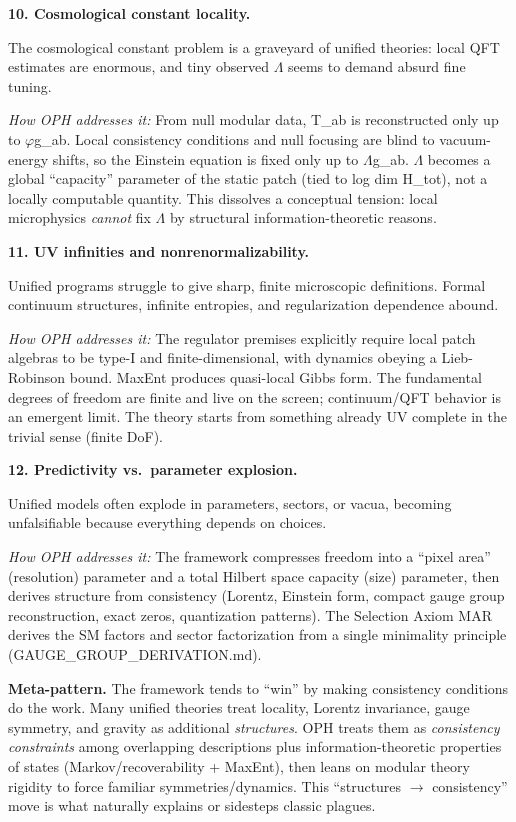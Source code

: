 \documentclass[11pt,a4paper]{article}
\theoremstyle{remark}
\begin{document}
\textbf{10. Cosmological constant locality.}

The cosmological constant problem is a graveyard of unified theories: local QFT estimates are enormous, and tiny observed \ensuremath{\Lambda} seems to demand absurd fine tuning.

\emph{How OPH addresses it:} From null modular data, T\_ab is reconstructed only up to \ensuremath{\varphi}g\_ab. Local consistency conditions and null focusing are blind to vacuum-energy shifts, so the Einstein equation is fixed only up to \ensuremath{\Lambda}g\_ab. \ensuremath{\Lambda} becomes a global ``capacity'' parameter of the static patch (tied to log dim H\_tot), not a locally computable quantity. This dissolves a conceptual tension: local microphysics \emph{cannot} fix \ensuremath{\Lambda} by structural information-theoretic reasons.

\textbf{11. UV infinities and nonrenormalizability.}

Unified programs struggle to give sharp, finite microscopic definitions. Formal continuum structures, infinite entropies, and regularization dependence abound.

\emph{How OPH addresses it:} The regulator premises explicitly require local patch algebras to be type-I and finite-dimensional, with dynamics obeying a Lieb-Robinson bound. MaxEnt produces quasi-local Gibbs form. The fundamental degrees of freedom are finite and live on the screen; continuum/QFT behavior is an emergent limit. The theory starts from something already UV complete in the trivial sense (finite DoF).

\textbf{12. Predictivity vs.~parameter explosion.}

Unified models often explode in parameters, sectors, or vacua, becoming unfalsifiable because everything depends on choices.

\emph{How OPH addresses it:} The framework compresses freedom into a ``pixel area'' (resolution) parameter and a total Hilbert space capacity (size) parameter, then derives structure from consistency (Lorentz, Einstein form, compact gauge group reconstruction, exact zeros, quantization patterns). The Selection Axiom MAR derives the SM factors and sector factorization from a single minimality principle (GAUGE\_GROUP\_DERIVATION.md).

\textbf{Meta-pattern.} The framework tends to ``win'' by making consistency conditions do the work. Many unified theories treat locality, Lorentz invariance, gauge symmetry, and gravity as additional \emph{structures}. OPH treats them as \emph{consistency constraints} among overlapping descriptions plus information-theoretic properties of states (Markov/recoverability + MaxEnt), then leans on modular theory rigidity to force familiar symmetries/dynamics. This ``structures \ensuremath{\to} consistency'' move is what naturally explains or sidesteps classic plagues.
\end{document}

